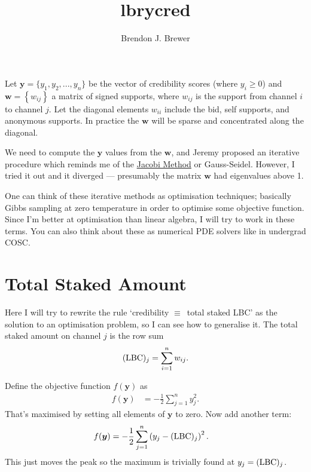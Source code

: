 \documentclass[a4paper, 12pt]{article}
\title{lbrycred}
\author{Brendon J. Brewer}
\date{}
\begin{document}
\maketitle


\setlength{\parindent}{0pt}
\setlength{\parskip}{8pt}

Let $\boldsymbol{y} = \{y_1, y_2, ..., y_n\}$ be the vector of credibility
scores (where $y_i \geq 0$) and $\boldsymbol{w} = \left\{w_{ij}\right\}$
a matrix of signed supports, where
$w_{ij}$ is the support from channel $i$ to channel $j$. Let the diagonal
elements $w_{ii}$ include the bid, self supports, and anonymous supports.
In practice the $\boldsymbol{w}$ will be sparse and concentrated along the
diagonal.

We need to compute the $\boldsymbol{y}$ values from the $\boldsymbol{w}$,
and Jeremy proposed an iterative procedure which reminds me of the
\href{https://en.wikipedia.org/wiki/Jacobi_method}{Jacobi Method} or
Gauss-Seidel. However,
I tried it out and it diverged --- presumably the matrix $\boldsymbol{w}$ had
eigenvalues above 1.

One can think of these iterative methods as optimisation techniques; basically
Gibbs sampling at zero temperature in order to optimise some objective
function. Since I'm better at optimisation than linear algebra, I will try to work in these terms. You can also think about these as numerical PDE solvers
like in undergrad COSC.

\section{Total Staked Amount}
Here I will try to rewrite the rule `credibility $\equiv$~total staked LBC'
as the solution to an optimisation problem, so I can see how to generalise it.
The total staked amount on channel $j$ is the row sum
\begin{align}
(\textnormal{LBC})_j = \sum_{i=1}^n w_{ij}.
\end{align}

Define the objective function $f(\boldsymbol{y})$ as
\begin{align}
f(\boldsymbol{y}) &= -\frac{1}{2}\sum_{j=1}^n y_j^2.
\end{align}
That's maximised by setting all elements of $\boldsymbol{y}$ to zero.
Now add another term:
\begin{align}
f(\boldsymbol{y}) &= -\frac{1}{2}\sum_{j=1}^n
                            \left(y_j - (\textnormal{LBC})_j\right)^2.
\end{align}
This just moves the peak so the maximum is trivially found at
$y_j = (\textnormal{LBC})_j$.




\end{document}
